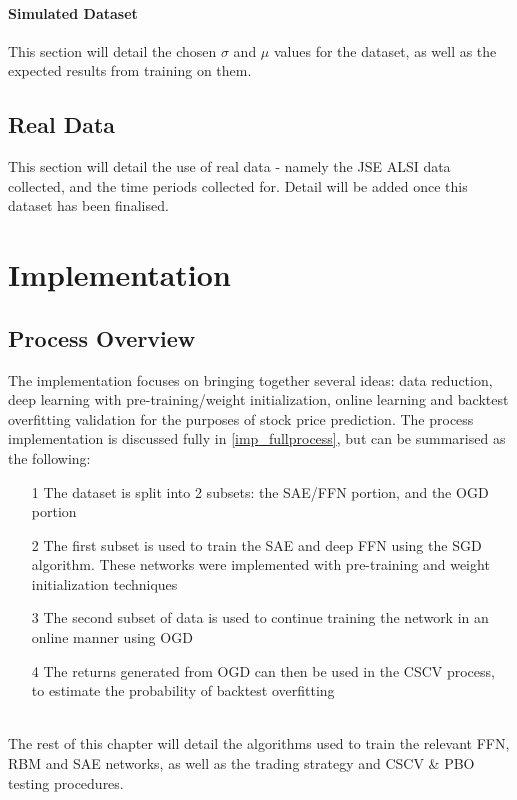 \documentclass[a4paper,latin]{paper}
\begin{document}
\paragraph{Simulated Dataset}

This section will detail the chosen $\sigma$ and $\mu$ values for the dataset, as well as the expected results from training on them.


\subsection{Real Data}

This section will detail the use of real data - namely the JSE ALSI data collected, and the time periods collected for. Detail will be added once this dataset has been finalised. 

\newpage
\section{Implementation}\label{Implementation}
\subsection{Process Overview}\label{ProcessOverview}\label{imp_overview}


The implementation focuses on bringing together several ideas: data reduction, deep learning with pre-training/weight initialization, online learning and backtest overfitting validation for the purposes of stock price prediction. The process implementation is discussed fully in \ref{imp_fullprocess}, but can be summarised as the following:

\begin{itemize}
	\item [1] The dataset is split into 2 subsets: the SAE/FFN  portion, and the OGD portion
	\item [2] The first subset is used to train the SAE and deep FFN using the SGD algorithm. These networks were implemented with pre-training and weight initialization techniques
	\item [3] The second subset of data is used to continue training the network in an online manner using OGD
	\item [4] The returns generated from OGD can then be used in the CSCV process, to estimate the probability of backtest overfitting
\end{itemize}
~\\
The rest of this chapter will detail the algorithms used to train the relevant FFN, RBM and SAE networks, as well as the trading strategy and CSCV \& PBO testing procedures.
\end{document}
